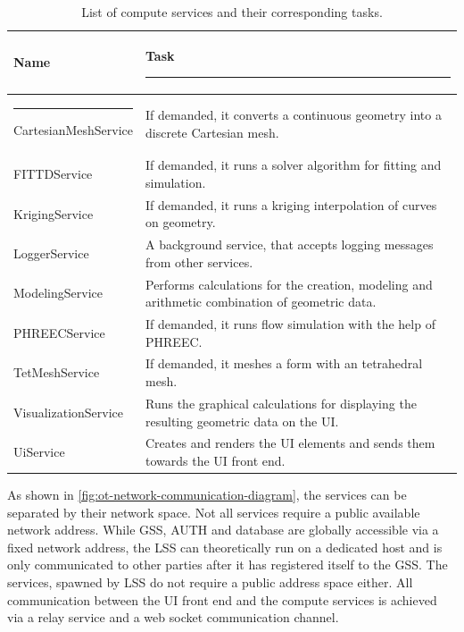 \begin{table}[h!]
	\centering
	\begin{tabular}{|l | p{}|} 
		\hline
		Name & Task  \rule{-5pt}{2.6ex} \\
		\hline \rule{-3pt}{3ex}
		CartesianMeshService & If demanded, it converts a continuous geometry into a discrete Cartesian mesh. \\
		FITTDService & If demanded, it runs a solver algorithm for fitting and simulation.\\
		KrigingService & If demanded, it runs a kriging interpolation of curves on geometry. \\ 
		LoggerService & A background service, that accepts logging messages from other services. \\ 
		ModelingService & Performs calculations for the creation, modeling and arithmetic combination of geometric data. \\ 
		PHREECService & If demanded, it runs flow simulation with the help of PHREEC. \\ 
		TetMeshService & If demanded, it meshes a form with an tetrahedral mesh.  \\ 
		VisualizationService & Runs the graphical calculations for displaying the resulting geometric data on the \ac{UI}.\\ 
		UiService & Creates and renders the \ac{UI} elements and sends them towards the \ac{UI} front end. \\ 
		[1ex] 
		\hline
	\end{tabular}
	\caption{List of compute services and their corresponding tasks.}
	\label{tbl:ot-compute-services}
\end{table}


As shown in \autoref{fig:ot-network-communication-diagram}, the services can be separated by their network space. Not all services require a public available network address.
While \ac{GSS}, \ac{AUTH} and database are globally accessible via a fixed network address, the \ac{LSS} can theoretically run on a dedicated host and is only communicated to other parties after it has registered itself to the \ac{GSS}. The services, spawned by \ac{LSS} do not require a public address space either. All communication between the \ac{UI} front end and the compute services is achieved via a relay service and a web socket communication channel.

